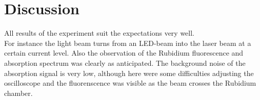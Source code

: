 \section{Discussion}
\label{sec:Diskussion}

All results of the experiment suit the expectations very well. \\
For instance the light beam turns from an LED-beam into the laser beam at a certain current level.
Also the observation of the Rubidium fluorescence and absorption spectrum was clearly as anticipated. 
The background noise of the absorption signal is very low, although here were some difficulties adjusting the 
oscilloscope and the fluorenscence was visible as the beam crosses the Rubidium chamber.